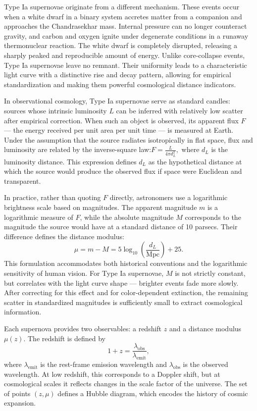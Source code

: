 Type Ia supernovae originate from a different mechanism. These events occur when a white dwarf in a binary system accretes matter from a companion and approaches the Chandrasekhar mass. Internal pressure can no longer counteract gravity, and carbon and oxygen ignite under degenerate conditions in a runaway thermonuclear reaction. The white dwarf is completely disrupted, releasing a sharply peaked and reproducible amount of energy. Unlike core-collapse events, Type Ia supernovae leave no remnant. Their uniformity leads to a characteristic light curve with a distinctive rise and decay pattern, allowing for empirical standardization and making them powerful cosmological distance indicators.

In observational cosmology, Type Ia supernovae serve as standard candles: sources whose intrinsic luminosity $L$ can be inferred with relatively low scatter after empirical correction. When such an object is observed, its apparent flux $F$ — the energy received per unit area per unit time — is measured at Earth. Under the assumption that the source radiates isotropically in flat space, flux and luminosity are related by the inverse-square law:$F = \frac{L}{4\pi d_L^2}, $ where $d_L$ is the luminosity distance. This expression defines $d_L$ as the hypothetical distance at which the source would produce the observed flux if space were Euclidean and transparent.

In practice, rather than quoting $F$ directly, astronomers use a logarithmic brightness scale based on magnitudes. The apparent magnitude $m$ is a logarithmic measure of $F$, while the absolute magnitude $M$ corresponds to the magnitude the source would have at a standard distance of 10 parsecs. Their difference defines the distance modulus:
\[
\mu = m - M = 5 \log_{10}\left( \frac{d_L}{\text{Mpc}} \right) + 25.
\]
This formulation accommodates both historical conventions and the logarithmic sensitivity of human vision. For Type Ia supernovae, $M$ is not strictly constant, but correlates with the light curve shape — brighter events fade more slowly. After correcting for this effect and for color-dependent extinction, the remaining scatter in standardized magnitudes is sufficiently small to extract cosmological information.

Each supernova provides two observables: a redshift $z$ and a distance modulus $\mu(z)$. The redshift is defined by
\[
1 + z = \frac{\lambda_{\text{obs}}}{\lambda_{\text{emit}}},
\]
where $\lambda_{\text{emit}}$ is the rest-frame emission wavelength and $\lambda_{\text{obs}}$ is the observed wavelength. At low redshift, this corresponds to a Doppler shift, but at cosmological scales it reflects changes in the scale factor of the universe. The set of points $(z, \mu)$ defines a Hubble diagram, which encodes the history of cosmic expansion.

